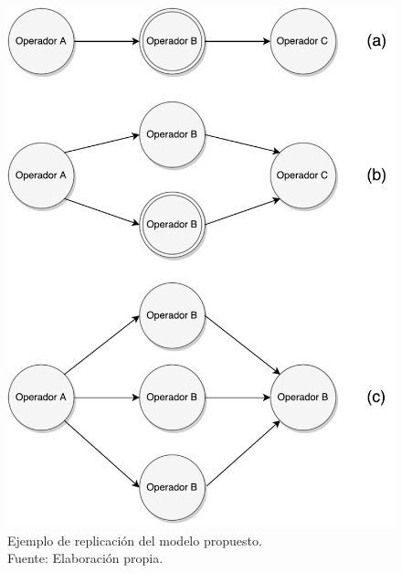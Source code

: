 \begin{figure}[!ht]
	\centering
		\includegraphics[scale=0.6]{images/EjReplicacion.pdf}
	\caption[Ejemplo de replicaci\'on del modelo propuesto.]{Ejemplo de replicaci\'on del modelo propuesto.\\Fuente: Elaboraci\'on propia.}
	\label{fig:ejReplicacion}
\end{figure}



